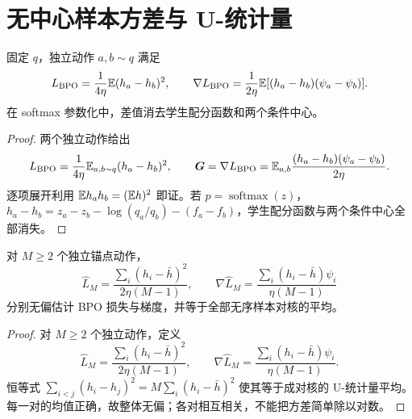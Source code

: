 \section{无中心样本方差与 U-统计量}
\begin{lemma}
固定 $q$，独立动作 $a,b\sim q$ 满足
\begin{equation}
L_{\rm BPO}=\frac1{4\eta}\mathbb E(h_a-h_b)^2,\qquad
\nabla L_{\rm BPO}=\frac1{2\eta}\mathbb E[(h_a-h_b)(\psi_a-\psi_b)].
\end{equation}
在 softmax 参数化中，差值消去学生配分函数和两个条件中心。
\end{lemma}
\begin{proof}
两个独立动作给出
\begin{equation}
L_{\rm BPO}=\frac1{4\eta}\mathbb E_{a,b\sim q}(h_a-h_b)^2,\qquad
\bm G=\nabla L_{\rm BPO}
=\mathbb E_{a,b}\frac{(h_a-h_b)(\psi_a-\psi_b)}{2\eta}.
\label{eq:pairwise}
\end{equation}
逐项展开利用 $\mathbb E h_a h_b=(\mathbb E h)^2$ 即证。若 $p=\operatorname{softmax}(z)$，$h_a-h_b=z_a-z_b-\log(q_a/q_b)-(f_a-f_b)$，学生配分函数与两个条件中心全部消失。
\end{proof}

\begin{proposition}
对 $M\ge2$ 个独立锚点动作，
\begin{equation}
\widehat L_M=\frac{\sum_i(h_i-\bar h)^2}{2\eta(M-1)},\qquad
\nabla\widehat L_M=\frac{\sum_i(h_i-\bar h)\psi_i}{\eta(M-1)}
\end{equation}
分别无偏估计 BPO 损失与梯度，并等于全部无序样本对核的平均。
\end{proposition}
\begin{proof}
对 $M\ge2$ 个独立动作，定义
\begin{equation}
\widehat L_M=\frac{\sum_i(h_i-\bar h)^2}{2\eta(M-1)},\qquad
\nabla\widehat L_M=\frac{\sum_i(h_i-\bar h)\psi_i}{\eta(M-1)}.
\end{equation}
恒等式 $\sum_{i<j}(h_i-h_j)^2=M\sum_i(h_i-\bar h)^2$ 使其等于成对核的 U-统计量平均。每一对的均值正确，故整体无偏；各对相互相关，不能把方差简单除以对数。
\end{proof}


